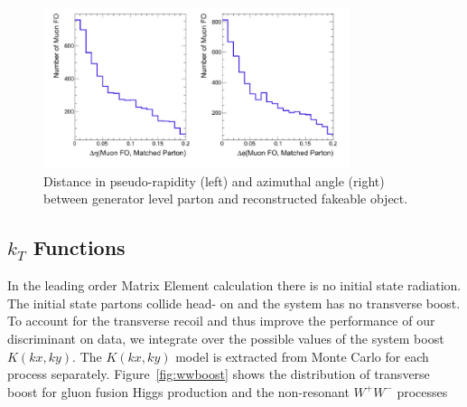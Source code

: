 \documentclass{cmspaper}
\begin{document}
\begin{figure}[!htbp]                                                                                         
\begin{center}                                                                                                
\includegraphics[width=0.8\textwidth]{figures/PartonLeptonDIrection.png}                                            
\caption{Distance in pseudo-rapidity (left) and azimuthal angle (right)
between generator level parton and reconstructed fakeable object.}                                                                                 
\label{fig:partonleptondirection}                                                                                          
\end{center}                                                                                                  
\end{figure}   

 
\subsection{$k_{T}$ Functions} 
In the leading order Matrix Element calculation there is no initial state radiation. The initial state partons 
collide head- on and the system has no transverse boost. To account for the transverse recoil and thus improve the performance 
of our discriminant on data, we integrate over the possible values of the system boost $K(kx,ky)$. The $K(kx,ky)$ model
is extracted from Monte Carlo for each process separately. Figure~\ref{fig:wwboost} shows the distribution of transverse boost for 
gluon fusion Higgs production and the non-resonant $W^{+}W^{-}$ processes
\end{document}
